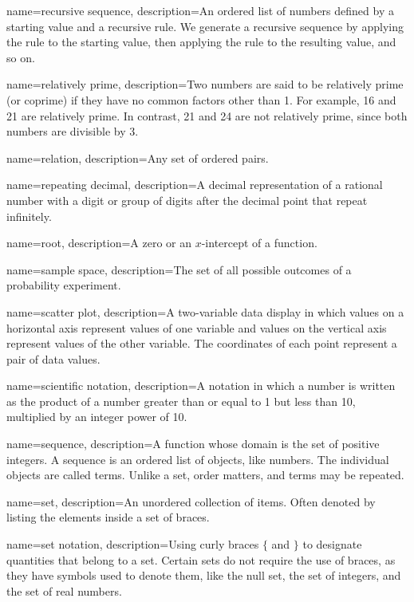  {
	name=recursive sequence,
	description={An ordered list of numbers defined by a starting value and a recursive rule. We generate a recursive sequence by applying the rule to the starting value, then applying the rule to the resulting value, and so on.}
}

 {
	name=relatively prime,
	description={Two numbers are said to be relatively prime (or coprime) if they have no common factors other than 1. For example, 16 and 21 are relatively prime. In contrast, 21 and 24 are not relatively prime, since both numbers are divisible by 3.}
}

 {
	name=relation,
	description={Any set of ordered pairs.}
}

 {
	name=repeating decimal,
	description={A decimal representation of a rational number with a digit or group of digits after the decimal point that repeat infinitely.}
}

 {
	name=root,
	description={A zero or an $x$-intercept of a function.}
}

 {
	name=sample space,
	description={The set of all possible outcomes of a probability experiment.}
}

 {
	name=scatter plot,
	description={A two-variable data display in which values on a horizontal axis represent values of one variable and values on the vertical axis represent values of the other variable. The coordinates of each point represent a pair of data values.}
}

 {
	name=scientific notation,
	description={A notation in which a number is written as the product of a number greater than or equal to 1 but less than 10, multiplied by an integer power of 10.}
}

 {
	name=sequence,
	description={A function whose domain is the set of positive integers. A sequence is an ordered list of objects, like numbers. The individual objects are called terms. Unlike a set, order matters, and terms may be repeated.}
}

 {
	name=set,
	description={An unordered collection of items. Often denoted by listing the elements inside a set of braces.}
}

 {
	name=set notation,
	description={Using curly braces $\{$ and $\}$ to designate quantities that belong to a set. Certain sets do not require the use of braces, as they have symbols used to denote them, like the \gls{null set}, the set of \glspl{integer}, and the set of \glspl{real number}.}
}


